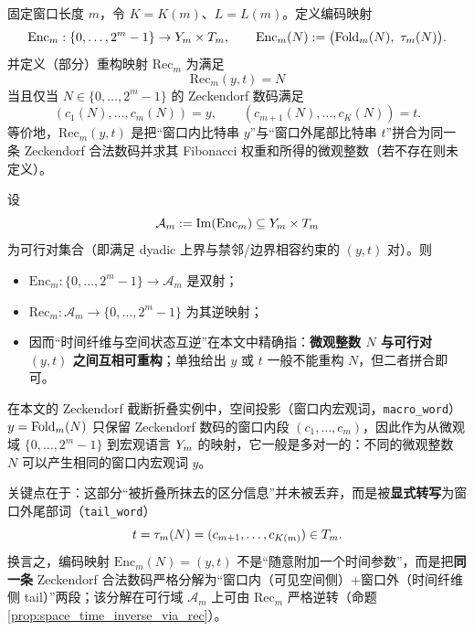\begin{definition}[编码/重构：空间状态与时间纤维的互逆拼合]\label{def:enc_rec_inverse_pair}
固定窗口长度 \(m\)，令 \(K=K(m)\)、\(L=L(m)\)。定义编码映射
$$
\mathrm{Enc}_m:\{0,\dots,2^m-1\}\to Y_m\times T_m,\qquad
\mathrm{Enc}_m(N):=\bigl(\mathrm{Fold}_m(N),\ \tau_m(N)\bigr).
$$
并定义（部分）重构映射 \(\mathrm{Rec}_m\) 为满足
$$
\mathrm{Rec}_m(y,t)=N
$$
当且仅当 \(N\in\{0,\dots,2^m-1\}\) 的 Zeckendorf 数码满足
\[
(c_1(N),\dots,c_m(N))=y,\qquad (c_{m+1}(N),\dots,c_K(N))=t.
\]
等价地，\(\mathrm{Rec}_m(y,t)\) 是把“窗口内比特串 \(y\)”与“窗口外尾部比特串 \(t\)”拼合为同一条 Zeckendorf 合法数码并求其 Fibonacci 权重和所得的微观整数（若不存在则未定义）。
\end{definition}

\begin{proposition}\label{prop:space_time_inverse_via_rec}
设
$$
\mathcal A_m:=\mathrm{Im}(\mathrm{Enc}_m)\subseteq Y_m\times T_m
$$
为可行对集合（即满足 dyadic 上界与禁邻/边界相容约束的 \((y,t)\) 对）。则
\begin{itemize}
  \item \(\mathrm{Enc}_m:\{0,\dots,2^m-1\}\to \mathcal A_m\) 是双射；
  \item \(\mathrm{Rec}_m:\mathcal A_m\to \{0,\dots,2^m-1\}\) 为其逆映射；
  \item 因而“时间纤维与空间状态互逆”在本文中精确指：\textbf{微观整数 \(N\) 与可行对 \((y,t)\) 之间互相可重构}；单独给出 \(y\) 或 \(t\) 一般不能重构 \(N\)，但二者拼合即可。
\end{itemize}
\end{proposition}

\begin{remark}\label{rem:fold_pushes_info_to_tail}
在本文的 Zeckendorf 截断折叠实例中，空间投影（窗口内宏观词，\texttt{macro\_word}）\(y=\mathrm{Fold}_m(N)\) 只保留 Zeckendorf 数码的窗口内段 \((c_1,\dots,c_m)\)，因此作为从微观域 \(\{0,\dots,2^m-1\}\) 到宏观语言 \(Y_m\) 的映射，它一般是多对一的：不同的微观整数 \(N\) 可以产生相同的窗口内宏观词 \(y\)。
\par
关键点在于：这部分“被折叠所抹去的区分信息”并未被丢弃，而是被\textbf{显式转写}为窗口外尾部词（\texttt{tail\_word}）
$$
t=\tau_m(N)=(c_{m+1},\dots,c_{K(m)})\in T_m.
$$
换言之，编码映射 \(\mathrm{Enc}_m(N)=(y,t)\) 不是“随意附加一个时间参数”，而是把\textbf{同一条} Zeckendorf 合法数码严格分解为“窗口内（可见空间侧）+窗口外（时间纤维侧 tail）”两段；该分解在可行域 \(\mathcal A_m\) 上可由 \(\mathrm{Rec}_m\) 严格逆转（命题 \ref{prop:space_time_inverse_via_rec}）。
\end{remark}

